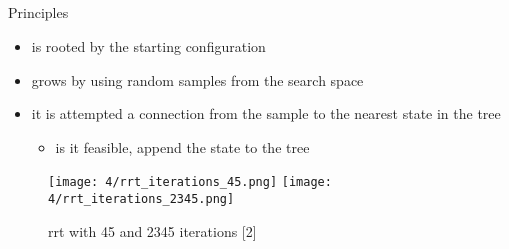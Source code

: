 \documentclass[%
  professionalfonts,%
  xcolor={%
    usenames,%
    dvipsnames,%
    svgnames,%
    table,%
    hyperref%
  }%
]{beamer}
\begin{document}
    \subsection*{}
      \begin{frame}{Principles}
        \begin{itemize}
            \item is rooted by the starting configuration
            \item grows by using random samples from the search space
            \item it is attempted a connection from the sample to the nearest state in the tree
            \begin{itemize}
              \item is it feasible, append the state to the tree
            \end{itemize}
        \end{itemize}
        \vspace{-5pt}
        \begin{figure}[h]
          \texttt{[image: 4/rrt\_iterations\_45.png]}
          \texttt{[image: 4/rrt\_iterations\_2345.png]}
          \vspace{-10pt}
          \caption{\footnotesize rrt with 45 and 2345 iterations [2]}
          \label{fig:rrt_iterations_45_and_2345}
        \end{figure}

      \end{frame}
    
\end{document}
